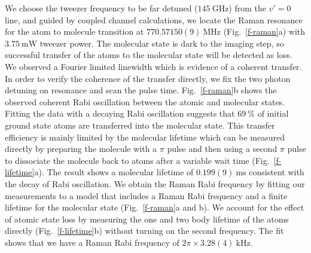 \documentclass[aps,prl,twocolumn,10pt,superscriptaddress]{revtex4-1}
\begin{document}
We choose the tweezer frequency to be far detuned ($145 ~\mathrm{GHz}$) from the $v' = 0$ line, and guided by coupled channel calculations,
we locate the Raman resonance for the atom to molecule transition at
$770.57150(9) ~\mathrm{MHz}$ (Fig.~\ref{f-raman}a)
with $3.75~\mathrm{mW}$ tweezer power.
The molecular state is dark to the imaging step,
so successful transfer of the atoms to the molecular state will be detected as loss.
We observed a Fourier limited linewidth which is evidence of a coherent transfer.
In order to verify the coherence of the transfer directly,
we fix the two photon detuning on resonance and scan the pulse time.
Fig.~\ref{f-raman}b shows the observed coherent Rabi oscillation between the atomic and molecular states.
Fitting the data with a decaying Rabi oscillation suggests that
$69~\mathrm{\%}$ of initial ground state atoms are transferred into the molecular state.
This transfer efficiency is mainly limited by the molecular lifetime
which can be measured directly by preparing the molecule with a $\pi $ pulse
and then using a second $\pi$ pulse to dissociate the molecule back to atoms
after a variable wait time (Fig.~\ref{f-lifetime}a).
The result shows a molecular lifetime of $0.199(9)~\mathrm{ms}$
consistent with the decay of Rabi oscillation.
We obtain the Raman Rabi frequency by fitting our measurements to a model
that includes a Raman Rabi frequency and
a finite lifetime for the molecular state (Fig.~\ref{f-raman}a and b).
We account for the effect of atomic state loss by measuring the one and
two body lifetime of the atoms directly (Fig.~\ref{f-lifetime}b)
without turning on the second frequency.
The fit shows that we have a Raman Rabi frequency of $2\pi\times3.28(4) ~\mathrm{kHz}$.
\end{document}
